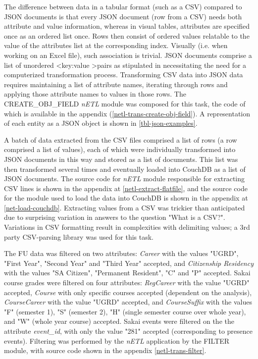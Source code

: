 The difference between data in a tabular format (such as a CSV) compared to JSON documents is that every JSON document (row from a CSV) needs both attribute and value information, whereas in visual tables, attributes are specified once as an ordered list once. Rows then consist of ordered values relatable to the value of the attributes list at the corresponding index. Visually (i.e. when working on an Excel file), such association is trivial. JSON documents comprise a list of unordered \textless key:value \textgreater pairs as stipulated in \cite{rfc7159} necessitating the need for a computerized transformation process. Transforming CSV data into JSON data requires maintaining a list of attribute names, iterating through rows and applying those attribute names to values in those rows. The CREATE\_OBJ\_FIELD \textit{nETL} module was composed for this task, the code of which is available in the appendix (\ref{netl-trans-create-obj-field}). A representation of each entity as a JSON object is shown in \ref{tbl-json-examples}.

A batch of data extracted from the CSV files comprised a list of rows (a row comprised a list of values), each of which were individually transformed into JSON documents in this way and stored as a list of documents. This list was then transformed several times and eventually loaded into CouchDB as a list of JSON documents. The source code for \textit{nETL} module responsible for extracting CSV lines is shown in the appendix at \ref{netl-extract-flatfile}, and the source code for the module used to load the data into CouchDB is shown in the appendix at \ref{net-load-couchdb}. Extracting values from a CSV was trickier than anticipated due to surprising variation in answers to the question "What is a CSV?". Variations in CSV formatting result in complexities with delimiting values; a 3rd party CSV-parsing library was used for this task.

The FU data was filtered on two attributes: \textit{Career} with the values "UGRD", "First Year", "Second Year" and "Third Year" accepted, and \textit{Citizenship Residency} with the values "SA Citizen", "Permanent Resident", "C" and "P" accepted. Sakai course grades were filtered on four attributes: \textit{RegCareer} with the value "UGRD" accepted, \textit{Course} with only specific courses accepted (dependent on the analysis), \textit{CourseCareer} with the value "UGRD" accepted, and \textit{CourseSuffix} with the values "F" (semester 1), "S" (semester 2), "H" (single semester course over whole year), and "W" (whole year course) accepted. Sakai events were filtered on the the attribute \textit{event\_id}, with only the value "281" accepted (corresponding to presence events). Filtering was performed by the \textit{nETL} application by the FILTER module, with source code shown in the appendix \ref{netl-trans-filter}.

